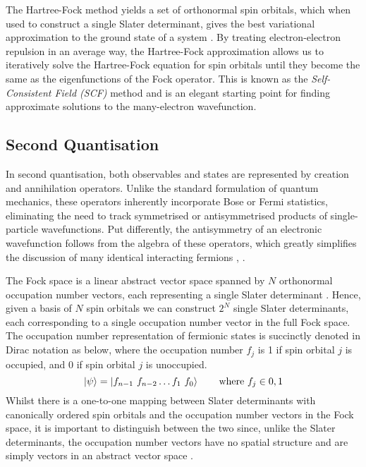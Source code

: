 The Hartree-Fock method yields a set of orthonormal spin orbitals, which when used to construct a single Slater determinant, gives the best variational approximation to the ground state of a system \cite{Atilla1996}. By treating electron-electron repulsion in an average way, the Hartree-Fock approximation allows us to iteratively solve the Hartree-Fock equation for spin orbitals until they become the same as the eigenfunctions of the Fock operator. This is known as the \textit{Self-Consistent Field (SCF)} method and is an elegant starting point for finding approximate solutions to the many-electron wavefunction.

\subsection{\label{second-quantisation}Second Quantisation}

In second quantisation, both observables and states are represented by creation and annihilation operators. Unlike the standard formulation of quantum mechanics, these operators inherently incorporate Bose or Fermi statistics, eliminating the need to track symmetrised or antisymmetrised products of single-particle wavefunctions. Put differently, the antisymmetry of an electronic wavefunction follows from the algebra of these operators, which greatly simplifies the discussion of many identical interacting fermions \cite{Helgaker2000}, \cite{Fetter1972}.

The Fock space is a linear abstract vector space spanned by $N$ orthonormal occupation number vectors, each representing a single Slater determinant \cite{Helgaker2000}. Hence, given a basis of $N$ spin orbitals we can construct $2^N$ single Slater determinants, each corresponding to a single occupation number vector in the full Fock space. The occupation number representation of fermionic states is succinctly denoted in Dirac notation as below, where the occupation number $f_j$ is 1 if spin orbital $j$ is occupied, and 0 if spin orbital $j$ is unoccupied.
\begin{equation*}
    \ket\psi = \ket{f_{n-1} \,\, f_{n-2} \dots f_{1} \,\, f_{0}} \qquad \text{where } f_{j} \in {0, 1}
\end{equation*}
Whilst there is a one-to-one mapping between Slater determinants with canonically ordered spin orbitals and the occupation number vectors in the Fock space, it is important to distinguish between the two since, unlike the Slater determinants, the occupation number vectors have no spatial structure and are simply vectors in an abstract vector space \cite{Helgaker2000}.

